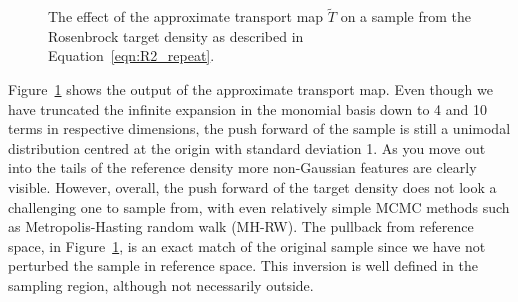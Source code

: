 \documentclass[final]{siamltex}
\begin{document}
\begin{figure}[htpb]
\centering
{}\quad
{}\quad
{}
\caption{The effect of the approximate transport map $\tilde{T}$ on a
  sample from the Rosenbrock target density as described in Equation~\eqref{eqn:R2_repeat}.}
\label{fig:R2_transport}
\end{figure}

Figure~\ref{fig:R2_transport} shows the output of the approximate
transport map. Even though we have truncated the infinite expansion in
the monomial basis down to 4 and 10 terms in respective dimensions,
the push forward of the sample is still a unimodal distribution
centred at the origin with standard deviation 1. As you move out into
the tails of the reference density more non-Gaussian features are
clearly visible. However, overall, the push forward of the target
density does not look a challenging one to sample from, with even
relatively simple MCMC methods such as Metropolis-Hasting random walk (MH-RW). The pullback from
reference space, in Figure~\ref{fig:R2_transport}, is an exact match
of the original sample since we have not perturbed the sample in
reference space. This inversion is well defined in the sampling
region, although not necessarily outside\cite{parno2014transport}.
\end{document}
